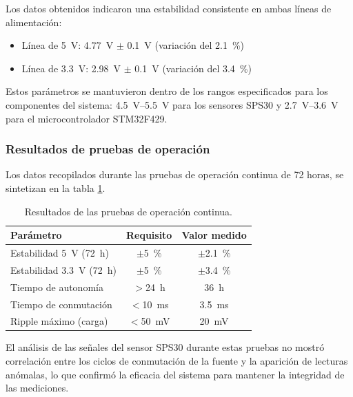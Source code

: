 Los datos obtenidos indicaron una estabilidad consistente en ambas líneas de alimentación:

\begin{itemize}
	\item Línea de \SI{5}{\volt}: \SI{4.77}{\volt} $\pm$ \SI{0.1}{\volt} (variación del \SI{2.1}{\percent})
	\item Línea de \SI{3.3}{\volt}: \SI{2.98}{\volt} $\pm$ \SI{0.1}{\volt} (variación del \SI{3.4}{\percent})
\end{itemize}

Estos parámetros se mantuvieron dentro de los rangos especificados para los componentes del sistema: \SIrange{4.5}{5.5}{\volt} para los sensores SPS30 y \SIrange{2.7}{3.6}{\volt} para el microcontrolador STM32F429.

\newpage
\subsubsection{Resultados de pruebas de operación}

Los datos recopilados durante las pruebas de operación continua de 72 horas, se sintetizan en la tabla \ref{tab:pruebas_continuidad}.

\begin{table}[h]
	\centering
	\caption{Resultados de las pruebas de operación continua.}
	\begin{tabular}{lcc}
		\toprule
		\textbf{Parámetro} & \textbf{Requisito} & \textbf{Valor medido} \\
		\midrule
		Estabilidad \SI{5}{\volt} (\SI{72}{\hour}) & $\pm$\SI{5}{\percent} & $\pm$\SI{2.1}{\percent} \\
		Estabilidad \SI{3.3}{\volt} (\SI{72}{\hour}) & $\pm$\SI{5}{\percent} & $\pm$\SI{3.4}{\percent} \\
		Tiempo de autonomía & $>$\SI{24}{\hour} & \SI{36}{\hour} \\
		Tiempo de conmutación & $<$\SI{10}{\milli\second} & \SI{3.5}{\milli\second} \\
		Ripple máximo (carga) & $<$\SI{50}{\milli\volt} & \SI{20}{\milli\volt} \\
		\bottomrule
	\end{tabular}
	\label{tab:pruebas_continuidad}
\end{table}

El análisis de las señales del sensor SPS30 durante estas pruebas no mostró correlación entre los ciclos de conmutación de la fuente y la aparición de lecturas anómalas, lo que confirmó la eficacia del sistema para mantener la integridad de las mediciones.

